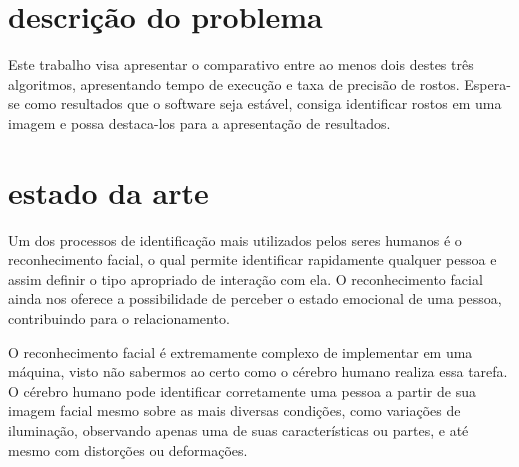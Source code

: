 
\section*{descrição do problema}

Este trabalho visa apresentar o comparativo entre ao menos dois destes três algoritmos, apresentando tempo de execução e taxa de precisão de rostos. Espera-se como resultados que o software seja estável, consiga identificar rostos em uma imagem e possa destaca-los para a apresentação de resultados.

\section*{estado da arte}

Um dos processos de identificação mais utilizados pelos seres humanos é o reconhecimento facial, o qual permite identificar rapidamente qualquer pessoa e assim definir o tipo apropriado de interação com ela. O reconhecimento facial ainda nos oferece a possibilidade de perceber o estado emocional de uma pessoa, contribuindo para o relacionamento.

O reconhecimento facial é extremamente complexo de implementar em uma máquina, visto não sabermos ao certo como o cérebro humano realiza essa tarefa. O cérebro humano pode identificar corretamente uma pessoa a partir de sua imagem facial mesmo sobre as mais diversas condições, como variações de iluminação, observando apenas uma de suas características ou partes, e até mesmo com distorções ou deformações.

